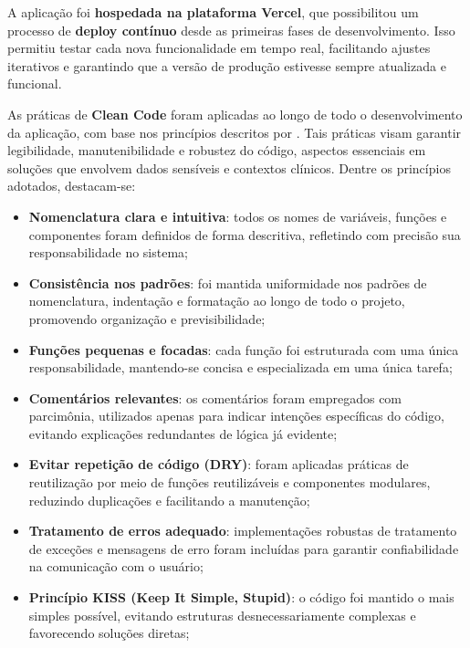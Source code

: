 A aplicação foi \textbf{hospedada na plataforma Vercel}, que possibilitou um processo de \textbf{deploy contínuo} desde as primeiras fases de desenvolvimento. Isso permitiu testar cada nova funcionalidade em tempo real, facilitando ajustes iterativos e garantindo que a versão de produção estivesse sempre atualizada e funcional.

As práticas de \textbf{Clean Code} foram aplicadas ao longo de todo o desenvolvimento da aplicação, com base nos princípios descritos por . Tais práticas visam garantir legibilidade, manutenibilidade e robustez do código, aspectos essenciais em soluções que envolvem dados sensíveis e contextos clínicos. Dentre os princípios adotados, destacam-se:

\begin{itemize}
    \item \textbf{Nomenclatura clara e intuitiva}: todos os nomes de variáveis, funções e componentes foram definidos de forma descritiva, refletindo com precisão sua responsabilidade no sistema;

    \item \textbf{Consistência nos padrões}: foi mantida uniformidade nos padrões de nomenclatura, indentação e formatação ao longo de todo o projeto, promovendo organização e previsibilidade;

    \item \textbf{Funções pequenas e focadas}: cada função foi estruturada com uma única responsabilidade, mantendo-se concisa e especializada em uma única tarefa;

    \item \textbf{Comentários relevantes}: os comentários foram empregados com parcimônia, utilizados apenas para indicar intenções específicas do código, evitando explicações redundantes de lógica já evidente;

    \item \textbf{Evitar repetição de código (DRY)}: foram aplicadas práticas de reutilização por meio de funções reutilizáveis e componentes modulares, reduzindo duplicações e facilitando a manutenção;

    \item \textbf{Tratamento de erros adequado}: implementações robustas de tratamento de exceções e mensagens de erro foram incluídas para garantir confiabilidade na comunicação com o usuário;

    \item \textbf{Princípio KISS (Keep It Simple, Stupid)}: o código foi mantido o mais simples possível, evitando estruturas desnecessariamente complexas e favorecendo soluções diretas;
\end{itemize}

